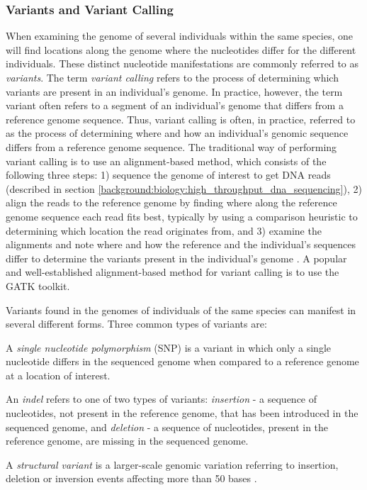 \subsubsection{Variants and Variant Calling} \label{background:biology:variants_and_variant_calling}
When examining the genome of several individuals within the same species, one will find locations along the genome where the nucleotides differ for the different individuals.
These distinct nucleotide manifestations are commonly referred to as \textit{variants}.
The term \textit{variant calling} refers to the process of determining which variants are present in an individual's genome.
In practice, however, the term variant often refers to a segment of an individual's genome that differs from a reference genome sequence.
Thus, variant calling is often, in practice, referred to as the process of determining where and how an individual's genomic sequence differs from a reference genome sequence.
The traditional way of performing variant calling is to use an alignment-based method, which consists of the following three steps:
1) sequence the genome of interest to get DNA reads (described in section \ref{background:biology:high_throughput_dna_sequencing}), 
2) align the reads to the reference genome by finding where along the reference genome sequence each read fits best, typically by using a comparison heuristic to determining which location the read originates from, and 
3) examine the alignments and note where and how the reference and the individual's sequences differ to determine the variants present in the individual's genome \cite{variant_calling}.
A popular and well-established alignment-based method for variant calling is to use the GATK \cite{gatk} toolkit.%

Variants found in the genomes of individuals of the same species can manifest in several different forms.
Three common types of variants are:
\begin{compactitem}
  \item A \textit{single nucleotide polymorphism} (SNP) is a variant in which only a single nucleotide differs in the sequenced genome when compared to a reference genome at a location of interest.
  \item An \textit{indel} refers to one of two types of variants: \textit{insertion} - a sequence of nucleotides, not present in the reference genome, that has been introduced in the sequenced genome, and \textit{deletion} - a sequence of nucleotides, present in the reference genome, are missing in the sequenced genome.
  \item A \textit{structural variant} is a larger-scale genomic variation referring to insertion, deletion or inversion events affecting more than 50 bases \cite{structural_variant_size}.
\end{compactitem}

